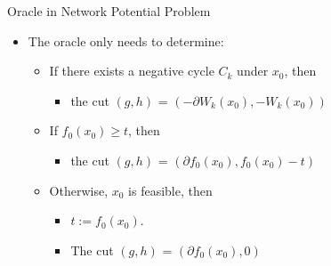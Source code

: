 \documentclass[10pt,ignorenonframetext,serif,onlymath]{beamer}
\providecommand{\tightlist}{%
  \setlength{\itemsep}{0pt}\setlength{\parskip}{0pt}}
\begin{document}
\begin{frame}{Oracle in Network Potential Problem}
\protect\hypertarget{sec:oracle-in-network-potential-problem}{}

\begin{itemize}
\tightlist
\item
  The oracle only needs to determine:

  \begin{itemize}
  \tightlist
  \item
    If there exists a negative cycle \(C_k\) under \(x_0\), then

    \begin{itemize}
    \tightlist
    \item
      the cut \((g, h)\) = \((-\partial W_k(x_0), -W_k(x_0))\)
    \end{itemize}
  \item
    If \(f_0(x_0) \geq t\), then

    \begin{itemize}
    \tightlist
    \item
      the cut \((g, h)\) = \((\partial f_0(x_0), f_0(x_0) - t)\)
    \end{itemize}
  \item
    Otherwise, \(x_0\) is feasible, then

    \begin{itemize}
    \tightlist
    \item
      \(t := f_0(x_0)\).
    \item
      The cut \((g, h)\) = \((\partial f_0(x_0), 0)\)
    \end{itemize}
  \end{itemize}
\end{itemize}

\end{frame}
\end{document}
